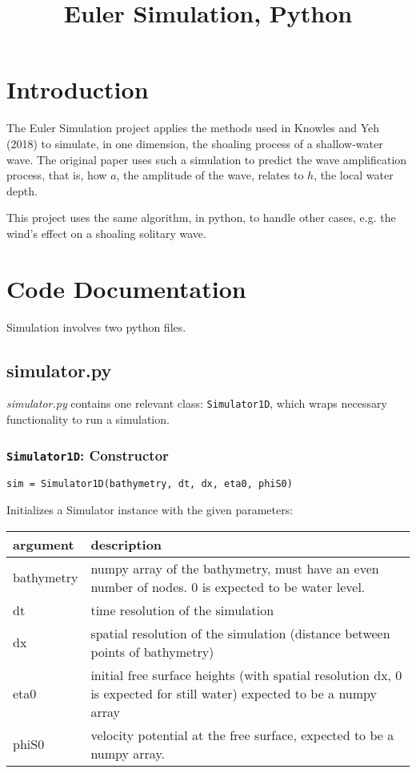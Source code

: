 \documentclass[10pt,a4paper]{article}
\title{Euler Simulation, Python}
\date{}
\newenvironment{arglist}
    {\begin{center}
    \begin{tabular}{l|p{12cm}}
    argument & description\\
    \hline
    }
    { 
    \end{tabular} 
    \end{center}
    }
\begin{document}
\maketitle

\tableofcontents
\newpage


\section{Introduction}

The Euler Simulation project applies the methods used in Knowles and Yeh (2018) to simulate, in one dimension, the shoaling process of a shallow-water wave. The original paper uses such a simulation to predict the wave amplification process, that is, how $a$, the amplitude of the wave, relates to $h$, the local water depth.

This project uses the same algorithm, in python, to handle other cases, e.g. the wind's effect on a shoaling solitary wave.
\pagebreak


\section{Code Documentation}

Simulation involves two python files.

\subsection{simulator.py}
\textit{simulator.py} contains one relevant class: \texttt{Simulator1D}, which wraps necessary functionality to run a simulation.





\subsubsection{\texttt{Simulator1D}: Constructor}
\texttt{sim = Simulator1D(bathymetry, dt, dx, eta0, phiS0)}

Initializes a Simulator instance with the given parameters:
\begin{arglist}
            bathymetry  &  numpy array of the bathymetry, must have an even
                            number of nodes. 0 is expected to be water level.\\\hline
            dt          &  time resolution of the simulation\\\hline
            dx          &  spatial resolution of the simulation (distance
                            between points of bathymetry)\\\hline
            eta0        &  initial free surface heights (with spatial
                            resolution dx, 0 is expected for still water)
                            expected to be a numpy array\\\hline
            phiS0       &  velocity potential at the free surface, expected
                            to be a numpy array.
\end{arglist}
\end{document}

